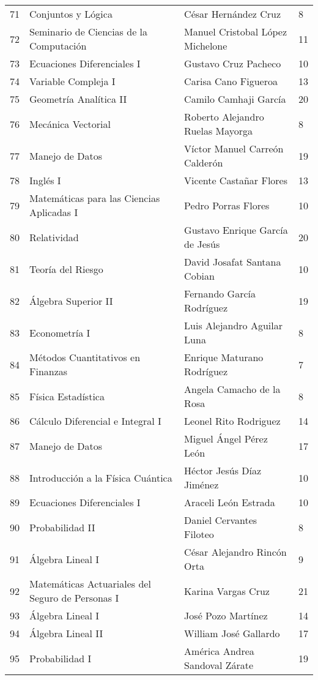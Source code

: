 \begin{table}[ht]
\begin{tabular}{rlll}
  71 & Conjuntos y Lógica & César Hernández Cruz & 8 \\ 
  72 & Seminario de Ciencias de la Computación & Manuel Cristobal López Michelone & 11 \\ 
  73 & Ecuaciones Diferenciales I & Gustavo Cruz Pacheco & 10 \\ 
  74 & Variable Compleja I & Carisa Cano Figueroa & 13 \\ 
  75 & Geometría Analítica II & Camilo Camhaji García & 20 \\ 
  76 & Mecánica Vectorial & Roberto Alejandro Ruelas Mayorga & 8 \\ 
  77 & Manejo de Datos & Víctor Manuel Carreón Calderón & 19 \\ 
  78 & Inglés I & Vicente Castañar Flores & 13 \\ 
  79 & Matemáticas para las Ciencias Aplicadas I & Pedro Porras Flores & 10 \\ 
  80 & Relatividad & Gustavo Enrique García de Jesús & 20 \\ 
  81 & Teoría del Riesgo & David Josafat Santana Cobian & 10 \\ 
  82 & Álgebra Superior II & Fernando García Rodríguez & 19 \\ 
  83 & Econometría I & Luis Alejandro Aguilar Luna & 8 \\ 
  84 & Métodos Cuantitativos en Finanzas & Enrique Maturano Rodríguez & 7 \\ 
  85 & Física Estadística & Angela Camacho de la Rosa & 8 \\ 
  86 & Cálculo Diferencial e Integral I & Leonel Rito Rodriguez & 14 \\ 
  87 & Manejo de Datos & Miguel Ángel Pérez León & 17 \\ 
  88 & Introducción a la Física Cuántica & Héctor Jesús Díaz Jiménez & 10 \\ 
  89 & Ecuaciones Diferenciales I & Araceli León Estrada & 10 \\ 
  90 & Probabilidad II & Daniel Cervantes Filoteo & 8 \\ 
  91 & Álgebra Lineal I & César Alejandro Rincón Orta & 9 \\ 
  92 & Matemáticas Actuariales del Seguro de Personas I & Karina Vargas Cruz & 21 \\ 
  93 & Álgebra Lineal I & José Pozo Martínez & 14 \\ 
  94 & Álgebra Lineal II & William José Gallardo & 17 \\ 
  95 & Probabilidad I & América Andrea Sandoval Zárate & 19 \\ 

\end{tabular}
\end{table}
